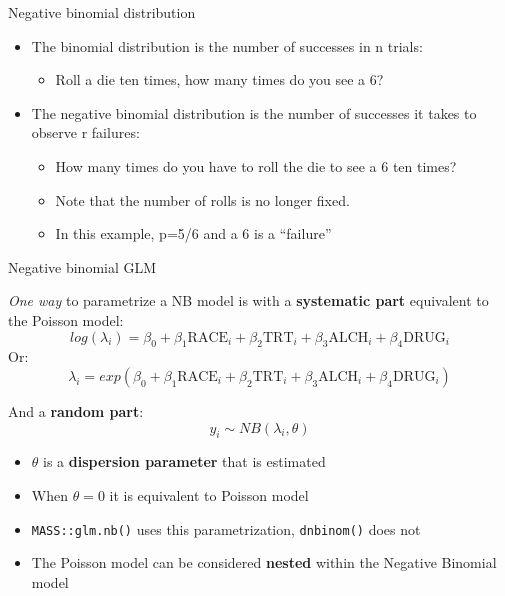 \documentclass[
  ignorenonframetext,
]{beamer}
\providecommand{\tightlist}{%
  \setlength{\itemsep}{0pt}\setlength{\parskip}{0pt}}
\begin{document}
\begin{frame}{Negative binomial distribution}
\protect\hypertarget{negative-binomial-distribution}{}

\begin{itemize}
\tightlist
\item
  The binomial distribution is the number of successes in n trials:

  \begin{itemize}
  \tightlist
  \item
    Roll a die ten times, how many times do you see a 6?
  \end{itemize}
\item
  The negative binomial distribution is the number of successes it takes
  to observe r failures:

  \begin{itemize}
  \tightlist
  \item
    How many times do you have to roll the die to see a 6 ten times?
  \item
    Note that the number of rolls is no longer fixed.
  \item
    In this example, p=5/6 and a 6 is a ``failure''
  \end{itemize}
\end{itemize}

\end{frame}

\begin{frame}[fragile]{Negative binomial GLM}
\protect\hypertarget{negative-binomial-glm}{}

\emph{One way} to parametrize a NB model is with a \textbf{systematic
part} equivalent to the Poisson model: \[
log(\lambda_i) = \beta_0 + \beta_1 \textrm{RACE}_i + \beta_2 \textrm{TRT}_i + \beta_3 \textrm{ALCH}_i + \beta_4 \textrm{DRUG}_i
\] Or: \[
\lambda_i = exp \left( \beta_0 + \beta_1 \textrm{RACE}_i + \beta_2 \textrm{TRT}_i + \beta_3 \textrm{ALCH}_i + \beta_4 \textrm{DRUG}_i \right)
\]

And a \textbf{random part}: \[
y_i \sim NB(\lambda_i, \theta)
\]

\begin{itemize}
\tightlist
\item
  \(\theta\) is a \textbf{dispersion parameter} that is estimated
\item
  When \(\theta = 0\) it is equivalent to Poisson model
\item
  \texttt{MASS::glm.nb()} uses this parametrization, \texttt{dnbinom()}
  does not
\item
  The Poisson model can be considered \textbf{nested} within the
  Negative Binomial model
\end{itemize}

\end{frame}
\end{document}
